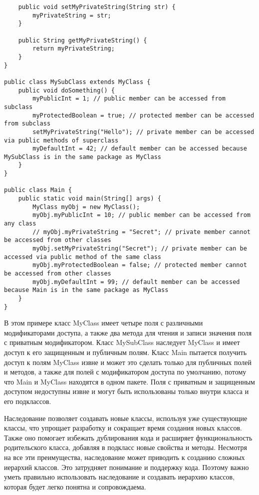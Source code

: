 \documentclass[12pt, a4paper]{book}%
\begin{document}
{\begin{lstlisting}
    public void setMyPrivateString(String str) {
        myPrivateString = str;
    }

    public String getMyPrivateString() {
        return myPrivateString;
    }
}

public class MySubClass extends MyClass {
    public void doSomething() {
        myPublicInt = 1; // public member can be accessed from subclass
        myProtectedBoolean = true; // protected member can be accessed from subclass
        setMyPrivateString("Hello"); // private member can be accessed via public methods of superclass
        myDefaultInt = 42; // default member can be accessed because MySubClass is in the same package as MyClass
    }
}

public class Main {
    public static void main(String[] args) {
        MyClass myObj = new MyClass();
        myObj.myPublicInt = 10; // public member can be accessed from any class
        // myObj.myPrivateString = "Secret"; // private member cannot be accessed from other classes
        myObj.setMyPrivateString("Secret"); // private member can be accessed via public method of the same class
        myObj.myProtectedBoolean = false; // protected member cannot be accessed from other classes
        myObj.myDefaultInt = 99; // default member can be accessed because Main is in the same package as MyClass
    }
}

\end{lstlisting}

В этом примере класс MyClass имеет четыре поля с различными модификаторами доступа, а также два метода для чтения и записи значения поля с приватным модификатором. Класс MySubClass наследует MyClass и имеет доступ к его защищенным и публичным полям. Класс Main пытается получить доступ к полям MyClass извне и может это сделать только для публичных полей и методов, а также для полей с модификатором доступа по умолчанию, потому что Main и MyClass находятся в одном пакете. Поля с приватным и защищенным доступом недоступны извне и могут быть использованы только внутри класса и его подклассов.

Наследование позволяет создавать новые классы, используя уже существующие классы, что упрощает разработку и сокращает время создания новых классов. Также оно помогает избежать дублирования кода и расширяет функциональность родительского класса, добавляя в подкласс новые свойства и методы. Несмотря на все эти преимущества, наследование может приводить к созданию сложных иерархий классов. Это затрудняет понимание и поддержку кода. Поэтому важно уметь правильно использовать наследование и создавать иерархию классов, которая будет легко понятна и сопровождаема.

}
\end{document}
